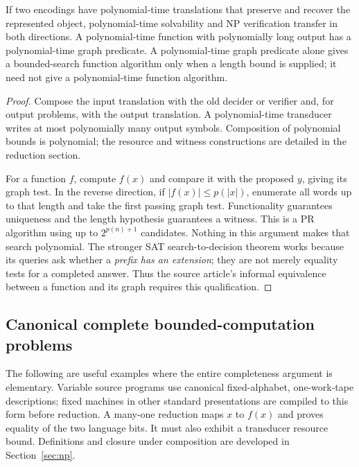 \begin{theorem}\label{thm:C04}
If two encodings have polynomial-time translations that preserve and recover the represented object, polynomial-time solvability and NP verification transfer in both directions. A polynomial-time function with polynomially long output has a polynomial-time graph predicate. A polynomial-time graph predicate alone gives a bounded-search function algorithm only when a length bound is supplied; it need not give a polynomial-time function algorithm.
\end{theorem}
\begin{proof}
Compose the input translation with the old decider or verifier and, for output problems, with the output translation. A polynomial-time transducer writes at most polynomially many output symbols. Composition of polynomial bounds is polynomial; the resource and witness constructions are detailed in the reduction section.

For a function $f$, compute $f(x)$ and compare it with the proposed $y$, giving its graph test. In the reverse direction, if $|f(x)|\le p(|x|)$, enumerate all words up to that length and take the first passing graph test. Functionality guarantees uniqueness and the length hypothesis guarantees a witness. This is a PR algorithm using up to $2^{p(n)+1}$ candidates. Nothing in this argument makes that search polynomial. The stronger SAT search-to-decision theorem works because its queries ask whether a \emph{prefix has an extension}; they are not merely equality tests for a completed answer. Thus the source article's informal equivalence between a function and its graph requires this qualification.
\end{proof}

\subsection{Canonical complete bounded-computation problems}
The following are useful examples where the entire completeness argument is elementary. Variable source programs use canonical fixed-alphabet, one-work-tape descriptions; fixed machines in other standard presentations are compiled to this form before reduction. A many-one reduction maps $x$ to $f(x)$ and proves equality of the two language bits. It must also exhibit a transducer resource bound. Definitions and closure under composition are developed in Section~\ref{sec:np}.

